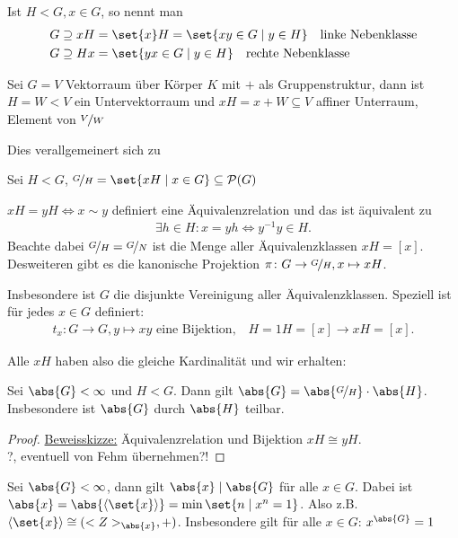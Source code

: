 \begin{definition}
	Ist $H < G, x \in G$, so nennt man
	\begin{align*}
	G \supseteq x H &= \set{x}H = \set{xy \in G \mid y \in H} \quad \text{linke Nebenklasse}\\
	G \supseteq H x &= \set{yx \in G \mid y \in H} \quad \text{rechte Nebenklasse}
	\end{align*}
\end{definition}
\begin{example}
	Sei $G = V$ Vektorraum über Körper $K$ mit $+$ als Gruppenstruktur, dann ist $H = W < V$ ein Untervektorraum und $xH = x + W \subseteq V$ affiner Unterraum, Element von $\lnkset{V}{W}$
\end{example}
Dies verallgemeinert sich zu
\begin{definition}
	Sei $H < G$, $\lnkset{G}{H} = \set{x H \mid x \in G} \subseteq \powerset(G)$
\end{definition}
\begin{remark}
	$xH = yH \Leftrightarrow x \sim y$ definiert eine Äquivalenzrelation und das ist äquivalent zu
	\begin{align*}
		\exists h \in H: x = yh \Leftrightarrow y^{-1}y \in H.
	\end{align*}
	Beachte dabei $\lnkset{G}{H} = \lnkset{G}{N}$ ist die Menge aller Äquivalenzklassen $xH = [x]$. Desweiteren gibt es die kanonische Projektion $\pi\colon G \to \lnkset{G}{H},x \mapsto xH$.
	
	Insbesondere ist $G$ die disjunkte Vereinigung aller Äquivalenzklassen. Speziell ist für jedes $x \in G$ definiert:
	\begin{align*}
		t_x\colon G \to G, y \mapsto xy \text{ eine Bijektion,} \quad H = 1H = [x] \to xH = [x].
	\end{align*}
\end{remark}

Alle $xH$ haben also die gleiche Kardinalität und wir erhalten:
\begin{proposition}
	Sei $\abs{G} < \infty$ und $H < G$. Dann gilt $\abs{G} = \abs{\lnkset{G}{H}}\cdot \abs{H}$. Insbesondere ist $\abs{G}$ durch $\abs{H}$ teilbar.
\end{proposition}
\begin{proof}
	\ul{Beweisskizze:} Äquivalenzrelation und Bijektion $xH \cong yH$.\\
	?, eventuell von Fehm übernehmen?!
\end{proof}

\begin{conclusion}
	Sei $\abs{G} < \infty$, dann gilt $\abs{x} \mid \abs{G}$ für alle $x \in G$. Dabei ist $\abs{x} = \abs{\langle \set{x}\rangle} = \min\set{n \mid x^n = 1}$. Also z.B. $\langle \set{x} \rangle \cong (\Z_{\abs{x}},+)$. Insbesondere gilt für alle $x \in G$:  $x^{\abs{G}} = 1$
\end{conclusion}

